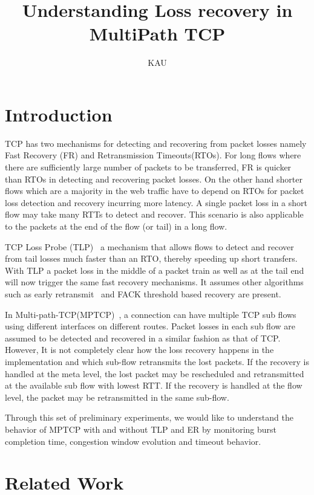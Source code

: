 \documentclass[12pt,draftcls,onecolumn]{IEEEtran}
\title{Understanding Loss recovery in MultiPath TCP }
\author{KAU}
\begin{document}
\maketitle

\begin{abstract}
\end{abstract}

\section{Introduction}
TCP has two mechanisms for detecting and recovering from packet losses namely Fast Recovery (FR) and Retransmission Timeouts(RTOs). For long flows where there are sufficiently large number of packets 
to be transferred, FR is quicker than RTOs in detecting and recovering packet losses. On the other hand shorter flows which are a majority in the web traffic have to depend on RTOs for packet loss detection 
and recovery incurring more latency. A single packet loss in a short flow may take many RTTs to detect and recover. This scenario is also applicable to the packets at the end of the flow (or tail) in a long 
flow.

TCP Loss Probe (TLP)~\cite{ietftlp} a mechanism that allows flows to detect and recover from tail losses much faster than an RTO, thereby speeding up short transfers. With TLP a packet loss in the middle 
of a packet train as well as at the tail end will now trigger the same fast recovery mechanisms. It assumes other algorithms such as early retransmit~\cite{rfc5827} and FACK threshold based recovery are 
present.

In Multi-path-TCP(MPTCP)~\cite{rfc6824}, a connection can have multiple TCP sub flows using different interfaces on different routes. Packet losses in each sub flow are assumed to be detected and recovered 
in a similar fashion as that of TCP. However, It is not completely clear how the loss recovery happens in the implementation and which sub-flow retransmits the lost packets. If the recovery is handled at the 
meta level, the lost packet may be rescheduled and retransmitted at the available sub flow with lowest RTT. If the recovery is handled at the flow level, the packet may be retransmitted in the same sub-flow. 

Through this set of preliminary experiments, we would like to understand the behavior of MPTCP with and without TLP and ER by monitoring burst completion time, congestion window evolution and timeout 
behavior.
\section{Related Work}\label{relwork}
\end{document}
